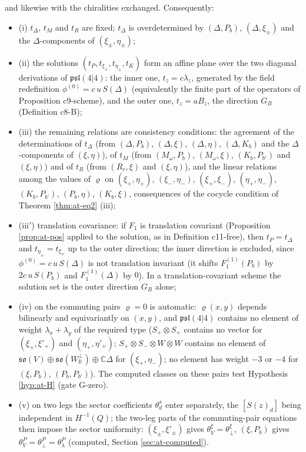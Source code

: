 \begin{theorem}
and likewise with the chiralities exchanged. Consequently:
\begin{itemize}
\item (i) $t_\Delta$, $t_M$ and $t_R$ are fixed; $t_\Delta$ is overdetermined by $(\Delta,P_b)$, $(\Delta,\xi_\pm)$ and the $\Delta$-components of $(\xi_\pm,\eta_\pm)$;
\item (ii) the solutions $(t_P,t_{\xi_\pm},t_{\eta_\pm},t_K)$ form an affine plane over the two diagonal derivations of $\mathfrak{psl}(4|4)$: the inner one, $t_z=c\lambda_z$, generated by the field redefinition $\phi^{(0)}=c\,u\,S(\Delta)$ (equivalently the finite part of the operators of Proposition c9-scheme), and the outer one, $t_z=aB_z$, the direction $G_B$ (Definition c8-B);
\item (iii) the remaining relations are consistency conditions: the agreement of the determinations of $t_\Delta$ (from $(\Delta,P_b)$, $(\Delta,\xi)$, $(\Delta,\eta)$, $(\Delta,K_b)$ and the $\Delta$-components of $(\xi,\eta)$), of $t_M$ (from $(M_\omega,P_b)$, $(M_\omega,\xi)$, $(K_b,P_{b'})$ and $(\xi,\eta)$) and of $t_R$ (from $(R_r,\xi)$ and $(\xi,\eta)$), and the linear relations among the values of $\varrho$ on $(\xi_+,\eta_+)$, $(\xi_-,\eta_-)$, $(\xi_+,\xi_-)$, $(\eta_+,\eta_-)$, $(K_b,P_{b'})$, $(P_b,\eta)$, $(K_b,\xi)$, consequences of the cocycle condition of Theorem \ref{thm:at-eq2} (iii);
\item (iii$'$) translation covariance: if $F_1$ is translation covariant (Proposition \ref{prop:at-pos} applied to the solution, as in Definition c11-free), then $t_P=t_\Delta$ and $t_{\eta_\pm}=t_{\xi_\mp}$ up to the outer direction; the inner direction is excluded, since $\phi^{(0)}=c\,u\,S(\Delta)$ is not translation invariant (it shifts $F_1^{(1)}(P_b)$ by $2c\,u\,S(P_b)$ and $F_1^{(1)}(\Delta)$ by $0$). In a translation-covariant scheme the solution set is the outer direction $G_B$ alone;
\item (iv) on the commuting pairs $\varrho=0$ is automatic: $\varrho(x,y)$ depends bilinearly and equivariantly on $(x,y)$, and $\mathfrak{psl}(4|4)$ contains no element of weight $\lambda_x+\lambda_y$ of the required type ($S_+\otimes S_+$ contains no vector for $(\xi_+,\xi'_+)$ and $(\eta_+,\eta'_+)$; $S_+\otimes S_-\otimes W\otimes W$ contains no element of $\mathfrak{so}(V)\oplus\mathfrak{so}(W^\perp_{\mathbb R})\oplus\mathbb C\Delta$ for $(\xi_+,\eta_-)$; no element has weight $-3$ or $-4$ for $(\xi,P_b)$, $(P_b,P_{b'})$). The computed classes on these pairs test Hypothesis \ref{hyp:at-H} (gate G-zero).
\item (v) on two legs the sector coefficients $\theta^x_d$ enter separately, the $[S(z)_d]$ being independent in $H^{-1}(Q)$; the two-leg parts of the commuting-pair equations then impose the sector uniformity: $(\xi_\pm,\xi'_\pm)$ gives $\theta^\xi_V=\theta^\xi_\perp$, $(\xi,P_b)$ gives $\theta^P_V=\theta^P_\perp=\theta^P_\lambda$ (computed, Section \ref{sec:at-computed}).
\end{itemize}
\end{theorem}

